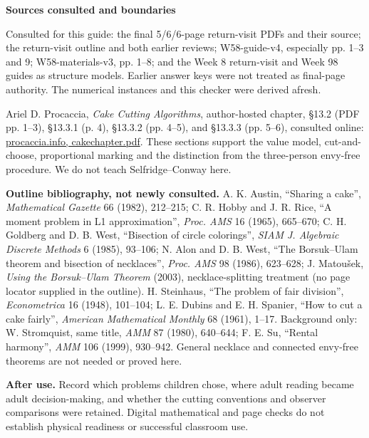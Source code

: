 \documentclass[11pt]{article}
\newcommand{\sub}[1]{\par\textbf{#1}\par}
\begin{document}
\sub{Sources consulted and boundaries}
Consulted for this guide: the final 5/6/6-page return-visit PDFs and their source; the return-visit outline and both earlier reviews; W58-guide-v4, especially pp. 1--3 and 9; W58-materials-v3, pp. 1--8; and the Week 8 return-visit and Week 98 guides as structure models. Earlier answer keys were not treated as final-page authority. The numerical instances and this checker were derived afresh.

Ariel D. Procaccia, \emph{Cake Cutting Algorithms}, author-hosted chapter, \S13.2 (PDF pp. 1--3), \S13.3.1 (p. 4), \S13.3.2 (pp. 4--5), and \S13.3.3 (pp. 5--6), consulted online: \href{https://procaccia.info/wp-content/uploads/2020/03/cakechapter.pdf}{procaccia.info, cakechapter.pdf}. These sections support the value model, cut-and-choose, proportional marking and the distinction from the three-person envy-free procedure. We do not teach Selfridge--Conway here.

\textbf{Outline bibliography, not newly consulted.} A. K. Austin, ``Sharing a cake'', \emph{Mathematical Gazette} 66 (1982), 212--215; C. R. Hobby and J. R. Rice, ``A moment problem in L1 approximation'', \emph{Proc. AMS} 16 (1965), 665--670; C. H. Goldberg and D. B. West, ``Bisection of circle colorings'', \emph{SIAM J. Algebraic Discrete Methods} 6 (1985), 93--106; N. Alon and D. B. West, ``The Borsuk--Ulam theorem and bisection of necklaces'', \emph{Proc. AMS} 98 (1986), 623--628; J. Matou\v{s}ek, \emph{Using the Borsuk--Ulam Theorem} (2003), necklace-splitting treatment (no page locator supplied in the outline). H. Steinhaus, ``The problem of fair division'', \emph{Econometrica} 16 (1948), 101--104; L. E. Dubins and E. H. Spanier, ``How to cut a cake fairly'', \emph{American Mathematical Monthly} 68 (1961), 1--17. Background only: W. Stromquist, same title, \emph{AMM} 87 (1980), 640--644; F. E. Su, ``Rental harmony'', \emph{AMM} 106 (1999), 930--942. General necklace and connected envy-free theorems are not needed or proved here.

\textbf{After use.} Record which problems children chose, where adult reading became adult decision-making, and whether the cutting conventions and observer comparisons were retained. Digital mathematical and page checks do not establish physical readiness or successful classroom use.
\end{document}
